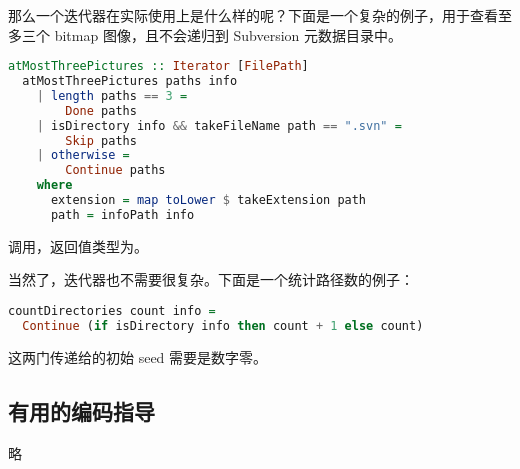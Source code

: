 \documentclass[./main.tex]{subfiles}
\begin{document}
那么一个迭代器在实际使用上是什么样的呢？下面是一个复杂的例子，用于查看至多三个 bitmap 图像，且不会递归到 Subversion 元数据目录中。

\begin{lstlisting}[language=Haskell]
  atMostThreePictures :: Iterator [FilePath]
  atMostThreePictures paths info
    | length paths == 3 =
        Done paths
    | isDirectory info && takeFileName path == ".svn" =
        Skip paths
    | otherwise =
        Continue paths
    where
      extension = map toLower $ takeExtension path
      path = infoPath info
\end{lstlisting}

调用，返回值类型为。

当然了，迭代器也不需要很复杂。下面是一个统计路径数的例子：

\begin{lstlisting}[language=Haskell]
  countDirectories count info =
  Continue (if isDirectory info then count + 1 else count)
\end{lstlisting}

这两门传递给的初始 seed 需要是数字零。

\subsection*{有用的编码指导}

略
\end{document}
